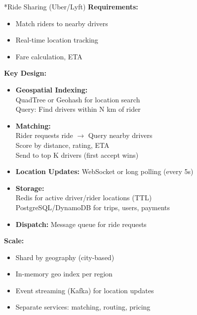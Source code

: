 \documentclass[8pt,landscape]{extarticle}
\makeatletter
\renewcommand{\subsection}{\@startsection{subsection}{2}{0pt}{3pt}{1pt}{\normalfont\normalsize\bfseries}}
\makeatother
\begin{document}
\begin{multicols*}{3}
\subsection*{Ride Sharing (Uber/Lyft)}
\textbf{Requirements:}
\begin{itemize}
\item Match riders to nearby drivers
\item Real-time location tracking
\item Fare calculation, ETA
\end{itemize}
\textbf{Key Design:}
\begin{itemize}
\item \textbf{Geospatial Indexing:}
  \\ QuadTree or Geohash for location search
  \\ Query: Find drivers within N km of rider
\item \textbf{Matching:}
  \\ Rider requests ride $\rightarrow$ Query nearby drivers
  \\ Score by distance, rating, ETA
  \\ Send to top K drivers (first accept wins)
\item \textbf{Location Updates:} WebSocket or long polling (every 5s)
\item \textbf{Storage:}
  \\ Redis for active driver/rider locations (TTL)
  \\ PostgreSQL/DynamoDB for trips, users, payments
\item \textbf{Dispatch:} Message queue for ride requests
\end{itemize}
\textbf{Scale:}
\begin{itemize}
\item Shard by geography (city-based)
\item In-memory geo index per region
\item Event streaming (Kafka) for location updates
\item Separate services: matching, routing, pricing
\end{itemize}


\end{multicols*}
\end{document}
